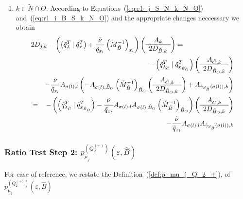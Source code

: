 \documentclass[a4paper]{article}
\newcommand{\pmu}[2]{\ensuremath{p_{\mu_{j}}^{(#1)}(\varepsilon, #2)}}
\begin{document}
\begin{enumerate}
\item $k \in \tilde{N} \cap O$:
According to Equations~(\ref{eq:r1_j_S_N_k_N_O})
and~(\ref{eq:r1_i_B_S_k_N_O}) and the appropriate changes neccessary we obtain
\begin{eqnarray}
\lefteqn{
2D_{j,k}-\left(
          \left(\tilde{q}_{\lambda}^{T}\left|\right. \tilde{q}_{x}^{T}\right)
	  +\frac{\tilde{\nu}}{\tilde{q}_{x_{l}}}
	  \left(M_{\tilde{B}}^{-1}\right)_{x_{l}}
	\right)
\left(\begin{array}{c}
        A_{k} \\
	\hline
	2D_{\tilde{B},k}
      \end{array}
\right)
=}
\nonumber \\
&&
-\left(\tilde{q}_{\lambda_{\tilde{C}}}^{T}\left|\right.
  \tilde{q}_{x_{\tilde{B}_{O}}}^{T}\right)
\left(\begin{array}{c}
        A_{\tilde{C},k} \\
	\hline
	2D_{\tilde{B}_{O},k}
      \end{array}
\right)
\nonumber \\
&&
-\frac{\tilde{\nu}}{\tilde{q}_{x_{l}}}A_{\sigma(l),l}
\left(
  -A_{\sigma(l), \tilde{B}_{O}}
  \left(\check{M}_{\tilde{B}}^{-1}\right)_{\tilde{B}_{O}}
  \left(\begin{array}{c}
          A_{\tilde{C},k} \\
	  \hline
	  2D_{\tilde{B}_{O},k}
        \end{array}
  \right)
  +A_{\tilde{\gamma}_{S_{\tilde{B}}}(\sigma(l)), k}
\right)
\nonumber \\
&=&
-\left(
  \left(\tilde{q}_{\lambda_{\tilde{C}}}^{T}\left|\right.
    \tilde{q}_{x_{\tilde{B}_{O}}}^{T}\right)
  -\frac{\tilde{\nu}}{\tilde{q}_{x_{l}}}A_{\sigma(l),l}
   A_{\sigma(l), \tilde{B}_{O}}
   \left(\check{M}_{\tilde{B}}^{-1}\right)_{\tilde{B}_{O}}
\right)
\left(\begin{array}{c}
        A_{\tilde{C},k} \\
	\hline
	2D_{\tilde{B}_{O},k}
      \end{array}
\right)
\nonumber \\
&&
 -\frac{\tilde{\nu}}{\tilde{q}_{x_{l}}}A_{\sigma(l),l}
 A_{\tilde{\gamma}_{S_{\tilde{B}}}(\sigma(l)), k}
\end{eqnarray}
\end{enumerate}

\subsubsection{Ratio Test Step 2:
\pmu{Q_{2}^{(+)}}{\hat{B}}}
For ease of reference, we restate the Definition~(\ref{def:p_mu_j_Q_2_+}),
of \pmu{Q_{2}^{(+)}}{\hat{B}}
\end{document}
